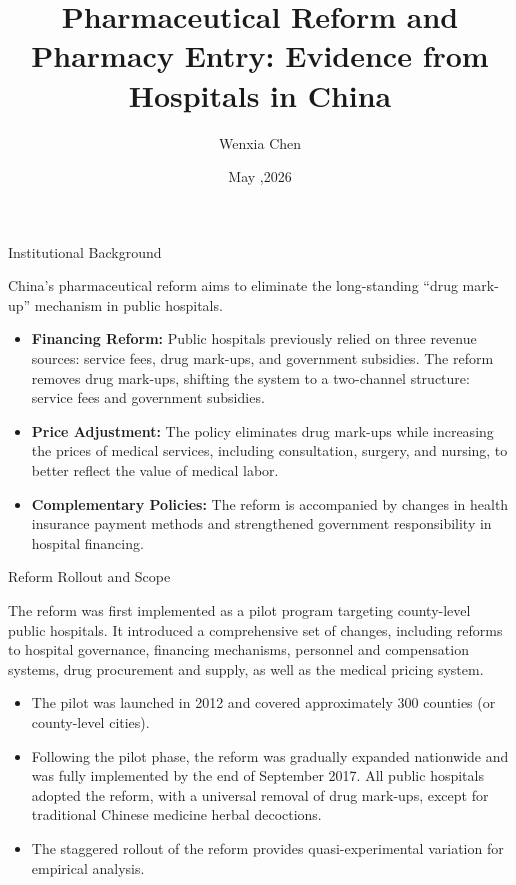 \documentclass{beamer}
\title{Pharmaceutical Reform and Pharmacy Entry: Evidence from Hospitals in China}
\author{Wenxia Chen}
\date{May ,2026}
\begin{document}


\frame{\titlepage}

\begin{frame}{Institutional Background}

China's pharmaceutical reform aims to eliminate the long-standing 
“drug mark-up” mechanism in public hospitals.

\begin{itemize}
    \item \textbf{Financing Reform:}
    Public hospitals previously relied on three revenue sources:
    service fees, drug mark-ups, and government subsidies. 
    The reform removes drug mark-ups, shifting the system to a 
    two-channel structure: service fees and government subsidies.

    \item \textbf{Price Adjustment:}
    The policy eliminates drug mark-ups while increasing the prices 
    of medical services, including consultation, surgery, and nursing, 
    to better reflect the value of medical labor.

    \item \textbf{Complementary Policies:}
    The reform is accompanied by changes in health insurance payment 
    methods and strengthened government responsibility in hospital financing.
\end{itemize}

\end{frame}

\begin{frame}{Reform Rollout and Scope}


The reform was first implemented as a pilot program targeting county-level public hospitals. It introduced a comprehensive set of changes, including reforms to hospital governance, financing mechanisms, personnel and compensation systems, drug procurement and supply, as well as the medical pricing system.
 \begin{itemize}
 \item The pilot was launched in 2012 and covered approximately 300 counties (or county-level cities).

 \item Following the pilot phase, the reform was gradually expanded nationwide and was fully implemented by the end of September 2017. All public hospitals adopted the reform, with a universal removal of drug mark-ups, except for traditional Chinese medicine herbal decoctions.

\item{The staggered rollout of the reform provides quasi-experimental variation for empirical analysis.}
\end{itemize}

\end{frame}
\end{document}

